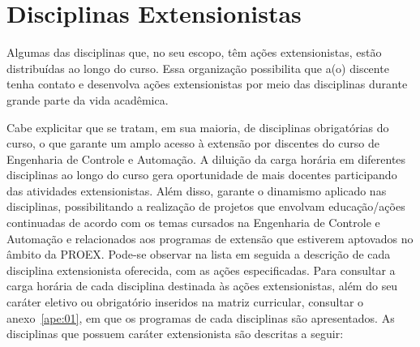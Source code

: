 \documentclass[
	12pt,				%
	openright,			%
	oneside,			%
	a4paper,			%
	english,			%
	brazil				%
	]{abntex2}
\begin{document}
\section{Disciplinas Extensionistas}
Algumas das disciplinas que, no seu escopo, têm ações extensionistas, estão distribuídas ao longo do curso. Essa organização possibilita que a(o) discente tenha contato e desenvolva ações extensionistas por meio das disciplinas durante grande parte da vida acadêmica.

Cabe explicitar que se tratam, em sua maioria, de disciplinas obrigatórias do curso, o que garante um amplo acesso à extensão por discentes do curso de Engenharia de Controle e Automação. A diluição da carga horária em diferentes disciplinas ao longo do curso gera oportunidade de mais docentes participando das atividades extensionistas. Além disso, garante o dinamismo aplicado nas disciplinas, possibilitando a realização de projetos que envolvam educação/ações continuadas de acordo com os temas cursados na Engenharia de Controle e Automação e relacionados aos programas de extensão que estiverem aptovados no âmbito da PROEX. Pode-se observar na lista em seguida a descrição de cada disciplina extensionista oferecida, com as ações especificadas. Para consultar a carga horária de cada disciplina destinada às ações extensionistas, além do seu caráter eletivo ou obrigatório inseridos na matriz curricular, consultar o anexo~\ref{ape:01}, em que os programas de cada disciplinas são apresentados. As disciplinas que possuem caráter extensionista são descritas a seguir:
\end{document}
